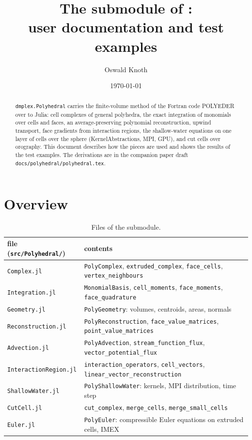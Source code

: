 \documentclass[11pt,a4paper]{article}
\title{The \code{Polyhedral} submodule of \code{dmplex}:\\ user documentation and test examples}
\author{Oswald Knoth}
\date{\today}
\newcommand{\code}[1]{\texttt{#1}}
\begin{document}
\sloppy
\maketitle

\begin{abstract}
\code{dmplex.Polyhedral} carries the finite-volume method of the Fortran code POLYEDER over to
Julia: cell complexes of general polyhedra, the exact integration of monomials over cells and faces,
an average-preserving polynomial reconstruction, upwind transport, face gradients from interaction
regions, the shallow-water equations on one layer of cells over the sphere (KernelAbstractions, MPI,
GPU), and cut cells over orography. This document describes how the pieces are used and shows the
results of the test examples. The derivations are in the companion paper draft
\code{docs/polyhedral/polyhedral.tex}.
\end{abstract}

\tableofcontents

\section{Overview}

\begin{table}[h]
\centering\small
\begin{tabular}{ll}
\toprule
file (\code{src/Polyhedral/}) & contents \\
\midrule
\code{Complex.jl} & \code{PolyComplex}, \code{extruded\_complex}, \code{face\_cells}, \code{vertex\_neighbours} \\
\code{Integration.jl} & \code{MonomialBasis}, \code{cell\_moments}, \code{face\_moments}, \code{face\_quadrature} \\
\code{Geometry.jl} & \code{PolyGeometry}: volumes, centroids, areas, normals \\
\code{Reconstruction.jl} & \code{PolyReconstruction}, \code{face\_value\_matrices}, \code{point\_value\_matrices} \\
\code{Advection.jl} & \code{PolyAdvection}, \code{stream\_function\_flux}, \code{vector\_potential\_flux} \\
\code{InteractionRegion.jl} & \code{interaction\_operators}, \code{cell\_vectors}, \code{linear\_vector\_reconstruction} \\
\code{ShallowWater.jl} & \code{PolyShallowWater}: kernels, MPI distribution, time step \\
\code{CutCell.jl} & \code{cut\_complex}, \code{merge\_cells}, \code{merge\_small\_cells} \\
\code{Euler.jl} & \code{PolyEuler}: compressible Euler equations on extruded cells, IMEX \\
\bottomrule
\end{tabular}
\caption{Files of the submodule.}
\end{table}
\end{document}
